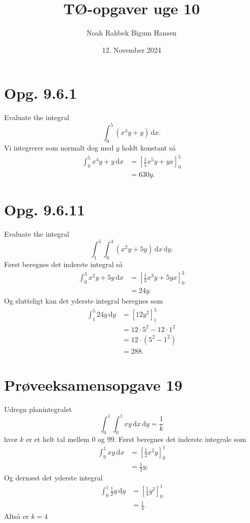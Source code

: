 \documentclass[12pt]{article}
\title{TØ-opgaver uge 10}
\author{Noah Rahbek Bigum Hansen}
\date{12. November 2024}
\theoremstyle{definition}
\begin{document}
\maketitle

\section*{Opg. 9.6.1}
Evaluate the integral
\[ 
\int_{0}^{5} \left( x^{4}y + y \right) \, \mathrm{d}x 
.\]
\bigbreak
Vi integrerer som normalt dog med $y$ holdt konstant så
\begin{align*}
  \int_{0}^{5} x^{4}y + y \, \mathrm{d}x &= \left[ \frac{1}{5}x^{5}y + yx \right]_0^{5} \\
  &= 630y
.\end{align*}


\section*{Opg. 9.6.11}
Evaluate the integral
\[ 
\int_{1}^{5} \int_{0}^{3} \left( x^2y + 5y \right) \, \mathrm{d}x \, \mathrm{d}y 
.\]
\bigbreak
Først beregnes det inderste integral så
\begin{align*}
  \int_{0}^{3} x^2y + 5y \, \mathrm{d}x &= \left[ \frac{1}{3}x^3y + 5yx \right]_0^{3} \\
  &= 24y
.\end{align*}
Og slutteligt kan det yderste integral beregnes som
\begin{align*}
  \int_{1}^{5} 24y \, \mathrm{d}y &= \left[ 12y^2 \right]_{1}^{5} \\
  &= 12\cdot 5^2 - 12\cdot 1^2 \\
  &= 12 \cdot (5^2 - 1^2) \\
  &= 288
.\end{align*}



\section*{Prøveeksamensopgave 19}
Udregn planintegralet
\[ 
\int_{0}^{1} \int_{0}^{1} xy \, \mathrm{d}x \, \mathrm{d}y = \frac{1}{k}
\]
hvor $k$ er et helt tal mellem 0 og 99.
\bigbreak
Først beregnes det inderste integrale som
\begin{align*}
  \int_{0}^{1} xy \, \mathrm{d}x &= \left[ \frac{1}{2}x^2y \right]_0^{1} \\
  &= \frac{1}{2}y
.\end{align*}
Og dernæst det yderste integral
\begin{align*}
  \int_{0}^{1} \frac{1}{2}y \, \mathrm{d}y &= \left[ \frac{1}{4}y^2 \right]_0^{1} \\
  &= \frac{1}{4}
.\end{align*}
Altså er $k = 4$
\end{document}
